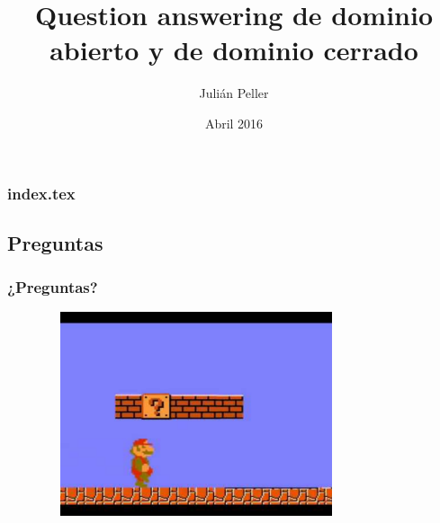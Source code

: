 \documentclass{beamer}
\title{Question answering de dominio abierto y de dominio cerrado}
\author{Julián Peller}
\date{Abril 2016} %
\begin{document}
\begin{frame}
  \titlepage
\end{frame}

\begin{frame}
  \frametitle{index.tex}
  \tableofcontents[pausesections]
\end{frame}








  \subsection*{Preguntas}
  \begin{frame}
    \frametitle{¿Preguntas?}
      \begin{figure}
        \includegraphics[width=9cm,height=6cm]{graficos/qmark2.pdf}
      \end{figure}
    \end{frame}
\end{document}
